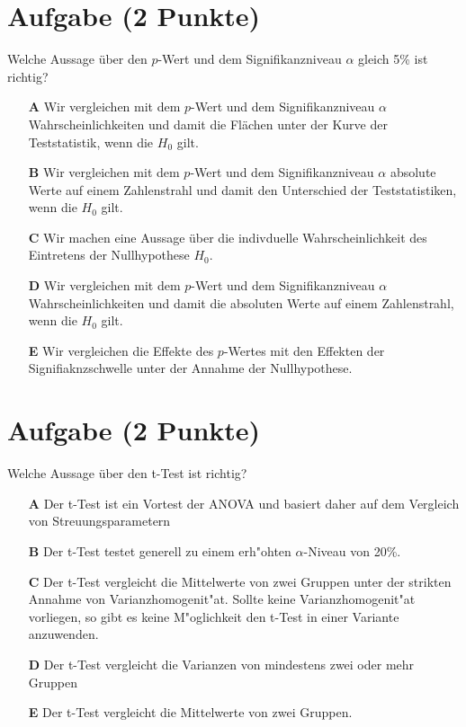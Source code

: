 \documentclass[a4paper, 10pt]{scrartcl}\usepackage[]{graphicx}\usepackage[]{xcolor}
\begin{document}
\section{Aufgabe \hfill (2 Punkte)}

Welche Aussage über den $p$-Wert und dem Signifikanzniveau $\alpha$ gleich 5\% ist richtig?



\begin{enumerate}
\item [\textbf{A} \msquare] Wir vergleichen mit dem $p$-Wert und dem Signifikanzniveau $\alpha$ Wahrscheinlichkeiten und damit die Flächen unter der Kurve der Teststatistik, wenn die $H_0$ gilt.
\item [\textbf{B} \msquare] Wir vergleichen mit dem $p$-Wert und dem Signifikanzniveau $\alpha$ absolute Werte auf einem Zahlenstrahl und damit den Unterschied der Teststatistiken, wenn die $H_0$ gilt.
\item [\textbf{C} \msquare] Wir machen eine Aussage über die indivduelle Wahrscheinlichkeit des Eintretens der Nullhypothese $H_0$.
\item [\textbf{D} \msquare] Wir vergleichen mit dem $p$-Wert und dem Signifikanzniveau $\alpha$ Wahrscheinlichkeiten und damit die absoluten Werte auf einem Zahlenstrahl, wenn die $H_0$ gilt.
\item [\textbf{E} \msquare] Wir vergleichen die Effekte des $p$-Wertes mit den Effekten der Signifiaknzschwelle unter der Annahme der Nullhypothese.
\end{enumerate}

\section{Aufgabe \hfill (2 Punkte)}

Welche Aussage {\"u}ber den t-Test ist richtig?



\begin{enumerate}
\item [\textbf{A} \msquare] Der t-Test ist ein Vortest der ANOVA und basiert daher auf dem Vergleich von Streuungsparametern
\item [\textbf{B} \msquare] Der t-Test testet generell zu einem erh{"o}hten $\alpha$-Niveau von 20\%.
\item [\textbf{C} \msquare] Der t-Test vergleicht die Mittelwerte von zwei Gruppen unter der strikten Annahme von Varianzhomogenit{"a}t. Sollte keine Varianzhomogenit{"a}t vorliegen, so gibt es keine M{"o}glichkeit den t-Test in einer Variante anzuwenden.
\item [\textbf{D} \msquare] Der t-Test vergleicht die Varianzen von mindestens zwei oder mehr Gruppen
\item [\textbf{E} \msquare] Der t-Test vergleicht die Mittelwerte von zwei Gruppen.
\end{enumerate}
\end{document}
